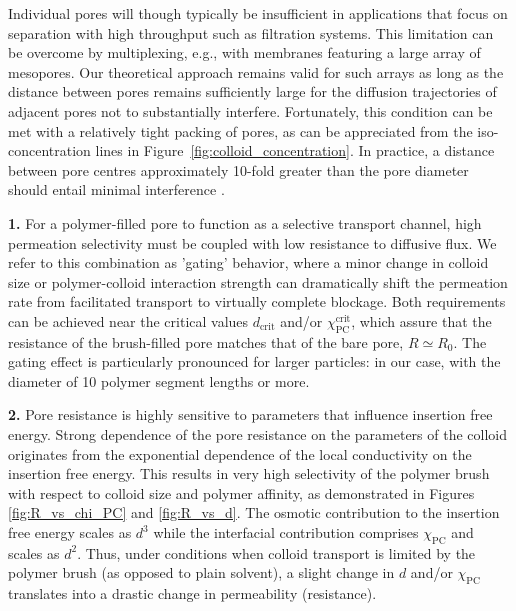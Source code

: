 \documentclass[12pt, a4paper]{article}
\begin{document}
Individual pores will though typically be insufficient in applications that focus on separation with high throughput such as filtration systems.
This limitation can be overcome by multiplexing, e.g., with membranes featuring a large array of mesopores.
Our theoretical approach remains valid for such arrays as long as the distance between pores remains sufficiently large for the diffusion trajectories of adjacent pores not to substantially interfere.
Fortunately, this condition can be met with a relatively tight packing of pores, as can be appreciated from the iso-concentration lines in Figure~\ref{fig:colloid_concentration}.
In practice, a distance between pore centres approximately 10-fold greater than the pore diameter should entail minimal interference \cite{Fabrikant1985}.

\bigskip


\textbf{1.}
For a polymer-filled pore to function as a selective transport channel, high permeation selectivity must be coupled with low resistance to diffusive flux.
We refer to this combination as 'gating' behavior, where a minor change in colloid size or polymer-colloid interaction strength can dramatically shift the permeation rate from facilitated transport to virtually complete blockage.
Both requirements can be achieved near the critical values $d_{\text{crit}}$ and/or $\chi_{\text{PC}}^{\text{crit}}$, which assure that the resistance of the brush-filled pore matches that of the bare pore, $R\simeq R_{0}$.
The gating effect is particularly pronounced for larger particles: in our case, with the diameter of 10 polymer segment lengths or more.

\textbf{2.}
Pore resistance is highly sensitive to parameters that influence insertion free energy.
Strong dependence of the pore resistance on the parameters of the colloid originates from the exponential dependence of the local conductivity on the insertion free energy.
This results in very high selectivity of the polymer brush with respect to colloid size and polymer affinity, as demonstrated in Figures \ref{fig:R_vs_chi_PC} and \ref{fig:R_vs_d}.
The osmotic contribution to the insertion free energy scales as $d^3$ while the interfacial contribution comprises $\chi_{\text{PC}}$ and scales as $d^2$.
Thus, under conditions when colloid transport is limited by the polymer brush (as opposed to plain solvent), a slight change in $d$ and/or $\chi_{\text{PC}}$ translates into a drastic change in permeability (resistance).
\end{document}
